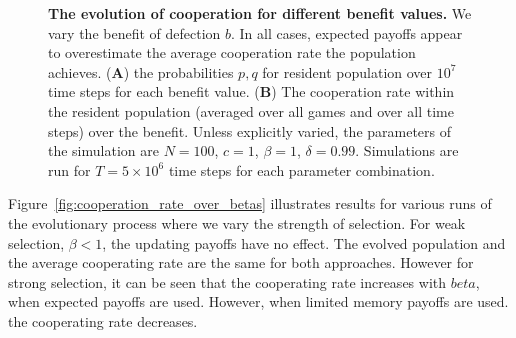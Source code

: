 \documentclass[11pt]{article}
\theoremstyle{plainCl1}
\theoremstyle{plainCl2}
\begin{document}
\begin{figure}[!htbp]
\begin{subfigure}{.5\textwidth}
  \end{subfigure}
  \caption{{\bf The evolution of cooperation for different benefit values.} 
  We vary the benefit of defection $b$. In all cases, expected payoffs appear to
  overestimate the average cooperation rate the population achieves. ({\bf A})
  the probabilities \(p, q\) for resident population over \(10^7\) time steps
  for each benefit value. ({\bf B}) The cooperation rate within the resident population
  (averaged over all games and over all time steps) over the benefit.
  Unless
  explicitly varied, the parameters of the simulation are $N\!=\!100$,
  $c\!=\!1$, $\beta\!=\!1$, $\delta\!=\!0.99$. Simulations are run
  for $T\!=\!5\times 10^6$ time steps for each parameter
  combination.}\label{fig:cooperation_rate_over_benefit}
\end{figure}

Figure~\ref{fig:cooperation_rate_over_betas} illustrates results for various
runs of the evolutionary process where we vary the strength of selection. For
weak selection, \(\beta < 1\), the updating payoffs have no effect. The evolved
population and the average cooperating rate are the same for both approaches.
However for strong selection, it can be seen that the cooperating rate increases
with \(beta\), when expected payoffs are used. However, when limited memory
payoffs are used. the cooperating rate decreases.
\end{document}
